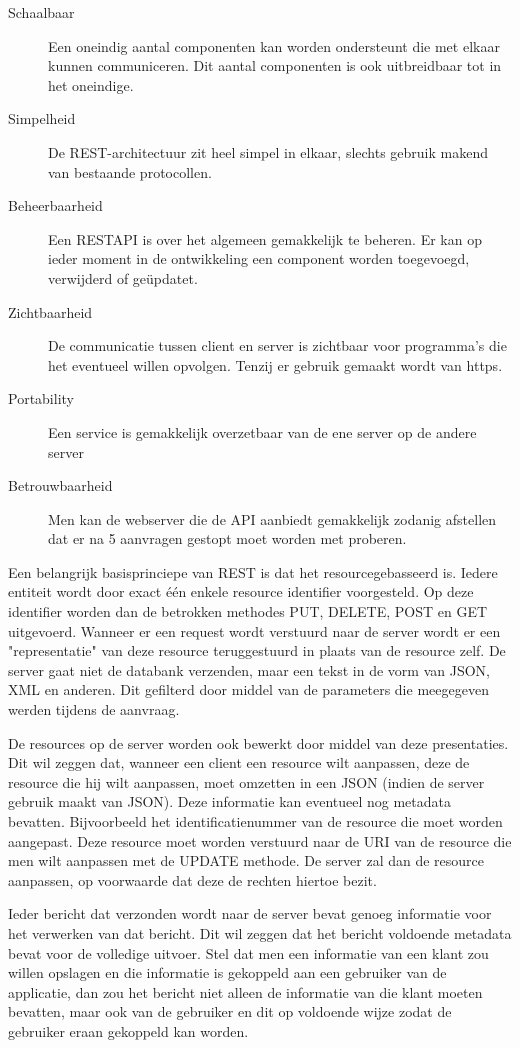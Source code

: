 \documentclass[a4paper,11pt]{article}
\begin{document}
\begin{description}
\item[Schaalbaar] Een oneindig aantal componenten kan worden ondersteunt die met elkaar kunnen communiceren. Dit aantal componenten is ook uitbreidbaar tot in het oneindige.
\item[Simpelheid] De REST-architectuur zit heel simpel in elkaar, slechts gebruik makend van bestaande protocollen.
\item[Beheerbaarheid] Een RESTAPI is over het algemeen gemakkelijk te beheren. Er kan op ieder moment in de ontwikkeling een component worden toegevoegd, verwijderd of geüpdatet.
\item[Zichtbaarheid] De communicatie tussen client en server is zichtbaar voor programma's die het eventueel willen opvolgen. Tenzij er gebruik gemaakt wordt van https.
\item[Portability] Een service is gemakkelijk overzetbaar van de ene server op de andere server
\item[Betrouwbaarheid] Men kan de webserver die de API aanbiedt gemakkelijk zodanig afstellen dat er na 5 aanvragen gestopt moet worden met proberen. 
\end{description}

Een belangrijk basisprinciepe van REST is dat het resourcegebasseerd is. Iedere entiteit wordt door exact één enkele resource identifier voorgesteld. Op deze identifier worden dan de betrokken methodes PUT, DELETE, POST en GET uitgevoerd. Wanneer er een request wordt verstuurd naar de server wordt er een "representatie" van deze resource teruggestuurd in plaats van de resource zelf. De server gaat niet de databank verzenden, maar een tekst in de vorm van JSON, XML en anderen. Dit gefilterd door middel van de parameters die meegegeven werden tijdens de aanvraag.

De resources op de server worden ook bewerkt door middel van deze presentaties. Dit wil zeggen dat, wanneer een client een resource wilt aanpassen, deze de resource die hij wilt aanpassen, moet omzetten in een JSON (indien de server gebruik maakt van JSON). Deze informatie kan eventueel nog metadata bevatten. Bijvoorbeeld het identificatienummer van de resource die moet worden aangepast. Deze resource moet worden verstuurd naar de URI van de resource die men wilt aanpassen met de UPDATE methode. De server zal dan de resource aanpassen, op voorwaarde dat deze de rechten hiertoe bezit.

Ieder bericht dat verzonden wordt naar de server bevat genoeg informatie voor het verwerken van dat bericht. Dit wil zeggen dat het bericht voldoende metadata bevat voor de volledige uitvoer. Stel dat men een informatie van een klant zou willen opslagen en die informatie is gekoppeld aan een gebruiker van de applicatie, dan zou het bericht niet alleen de informatie van die klant moeten bevatten, maar ook van de gebruiker en dit op voldoende wijze zodat de gebruiker eraan gekoppeld kan worden.
\end{document}
